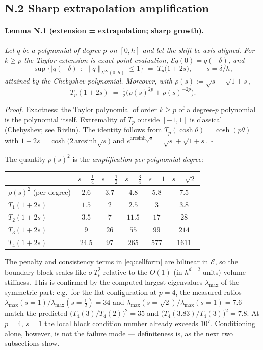 \subsection*{N.2 Sharp extrapolation amplification}

\paragraph{Lemma N.1 (extension = extrapolation; sharp growth).}
\emph{Let $q$ be a polynomial of degree $p$ on $[0,h]$ and let the shift be
axis-aligned. For $k \ge p$ the Taylor extension is exact point evaluation,
$\mathcal E q(0) = q(-\delta)$, and}
\[
  \sup\Big\{ |q(-\delta)| \,:\, \|q\|_{L^\infty(0,h)} \le 1 \Big\}
  \;=\; T_p\!\big(1 + 2s\big), \qquad s = \delta/h,
\]
\emph{attained by the Chebyshev polynomial. Moreover, with
$\rho(s) := \sqrt s + \sqrt{1+s}$,}
\[
  T_p(1+2s) \;=\; \tfrac12\Big( \rho(s)^{2p} + \rho(s)^{-2p} \Big).
\]

\emph{Proof.} Exactness: the Taylor polynomial of order $k\ge p$ of a
degree-$p$ polynomial is the polynomial itself. Extremality of $T_p$
outside $[-1,1]$ is classical (Chebyshev; see Rivlin). The identity follows
from $T_p(\cosh\theta) = \cosh(p\theta)$ with
$1+2s = \cosh\big(2\,\mathrm{arcsinh}\sqrt s\big)$ and
$e^{\mathrm{arcsinh}\sqrt s} = \sqrt s + \sqrt{1+s}$. $\square$

The quantity $\rho(s)^2$ is the \emph{amplification per polynomial degree}:

\begin{center}
\begin{tabular}{lccccc}
\hline
 & $s=\tfrac14$ & $s=\tfrac12$ & $s=\tfrac34$ & $s=1$ & $s=\sqrt2$ \\
\hline
$\rho(s)^2$ (per degree)      & $2.6$ & $3.7$ & $4.8$ & $5.8$ & $7.5$ \\
$T_1(1+2s)$ & $1.5$ & $2$ & $2.5$ & $3$ & $3.8$ \\
$T_2(1+2s)$ & $3.5$ & $7$ & $11.5$ & $17$ & $28$ \\
$T_3(1+2s)$ & $9$ & $26$ & $55$ & $99$ & $214$ \\
$T_4(1+2s)$ & $24.5$ & $97$ & $265$ & $577$ & $1611$ \\
\hline
\end{tabular}
\end{center}

The penalty and consistency terms in \eqref{eq:cellform} are bilinear in
$\mathcal E$, so the boundary block scales like $\sigma\, T_p^2$ relative to
the $O(1)$ (in $h^{d-2}$ units) volume stiffness. This is confirmed by the
computed largest eigenvalues $\lambda_{\max}$ of the symmetric part: e.g.\
for the flat configuration at $p=4$, the measured ratios
$\lambda_{\max}(s{=}1)/\lambda_{\max}(s{=}\tfrac12) = 34$ and
$\lambda_{\max}(s{=}\sqrt2)/\lambda_{\max}(s{=}1) = 7.6$ match the predicted
$\big(T_4(3)/T_4(2)\big)^2 = 35$ and $\big(T_4(3.83)/T_4(3)\big)^2 = 7.8$.
At $p=4$, $s=1$ the local block condition number already exceeds $10^7$.
Conditioning alone, however, is not the failure mode --- definiteness is,
as the next two subsections show.

